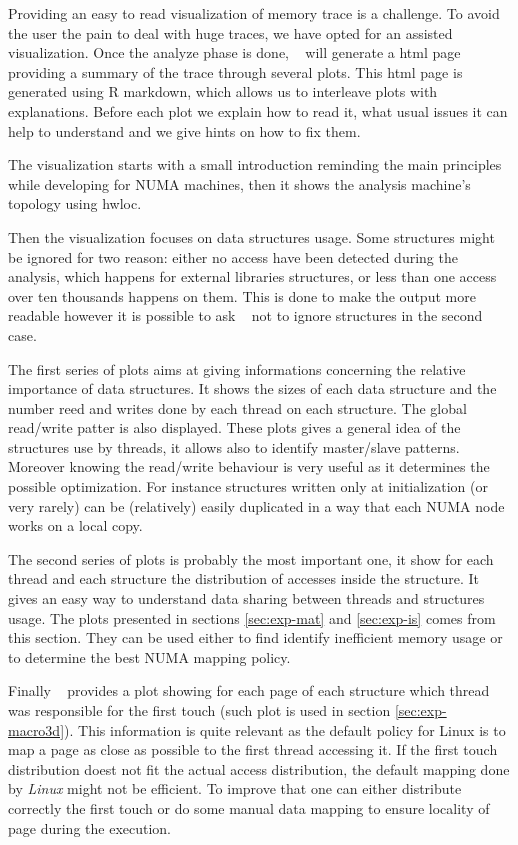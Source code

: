 Providing an easy to read visualization of memory trace is a challenge. To
avoid the user the pain to deal with huge traces, we have opted for an
assisted visualization. Once the analyze phase is done, \TABARNAC~ will
generate a html page providing a summary of the trace through several plots.
This html page is generated using R markdown, which allows us to interleave
plots with explanations. Before each plot we explain how to read it, what
usual issues it can help to understand and we give hints on how to fix them.

The visualization starts with a small introduction reminding the main
principles while developing for NUMA machines, then it shows the analysis
machine's topology using hwloc\cite{Broquedis10hwloc}.

Then the visualization focuses on data structures usage. Some structures might
be ignored for two reason: either no access have been detected during the
analysis, which happens for external libraries structures, or less than one
access over ten thousands happens on them. This is done to make the output
more readable however it is possible to ask \TABARNAC~ not to ignore
structures in the second case.

The first series of plots aims at giving informations concerning the relative
importance of data structures. It shows the sizes of each data structure and the
number reed and writes done by each thread on each structure. The global
read/write patter is also displayed. These plots gives a general idea of the
structures use by threads, it allows also to identify master/slave patterns.
Moreover knowing the read/write behaviour is very useful as it determines the
possible optimization. For instance structures written only at initialization
(or very rarely) can be (relatively) easily duplicated in a way that each NUMA
node works on a local copy.

The second series of plots is probably the most important one, it show for
each thread and each structure the distribution of accesses inside the
structure. It gives an easy way to understand data sharing between threads and
structures usage. The plots presented in sections \ref{sec:exp-mat} and
\ref{sec:exp-is} comes from this section. They can be used either to
find identify inefficient memory usage or to determine the best NUMA mapping
policy.

Finally \TABARNAC~ provides a plot showing for each page of each structure
which thread was responsible for the first touch (such plot is used in section
\ref{sec:exp-macro3d}). This information is quite relevant as the default
policy for Linux is to map a page as close as possible to the first thread
accessing it. If the first touch distribution doest not fit the actual access
distribution, the default mapping done by \emph{Linux} might not be efficient.
To improve that one can either distribute correctly the first touch or do some
manual data mapping to ensure locality of page during the execution.

